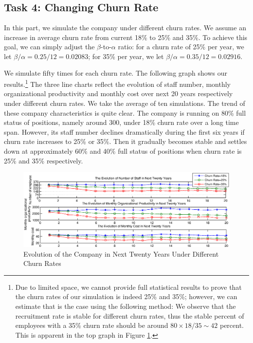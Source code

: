 \documentclass[tcn = 37075, sheet = false, abstract = false]{mcmthesis}
\begin{document}
\subsection{Task 4: Changing Churn Rate}

In this part, we simulate the company under different churn rates. We assume an increase in average churn rate from current 18\% to 25\% and 35\%. To achieve this goal, we can simply adjust the $\beta$-to-$\alpha$ ratio: for a churn rate of 25\% per year, we let $\beta/\alpha = 0.25/12 = 0.02083$; for 35\% per year, we let $\beta/\alpha = 0.35/12 = 0.02916$.

We simulate fifty times for each churn rate. The following graph shows our results.\footnote{Due to limited space, we cannot provide full statistical results to prove that the churn rates of our simulation is indeed 25\% and 35\%; however, we can estimate that is the case using the following method: We observe that the recruitment rate is stable for different churn rates, thus the stable percent of employees with a 35\% churn rate should be around $80 \times 18 / 35 \sim 42$ percent. This is apparent in the top graph in Figure \ref{fig:2}.}
The three line charts reflect the evolution of staff number, monthly organizational productivity and monthly cost over next 20 years respectively under different churn rates. We take the average of ten simulations. The trend of these company characteristics is quite clear. The company is running on 80\% full status of positions, namely around 300, under 18\% churn rate over a long time span. However, its staff number declines dramatically during the first six years if churn rate increases to 25\% or 35\%. Then it gradually becomes stable and settles down at approximately 60\% and 40\% full status of positions when churn rate is 25\% and 35\% respectively.


\begin{figure}[htb!]
\centering
\includegraphics[width=16cm]{Task4_1.eps}
\caption{Evolution of the Company in Next Twenty Years Under Different Churn Rates} 
\label{fig:2}
\end{figure}
\end{document}
